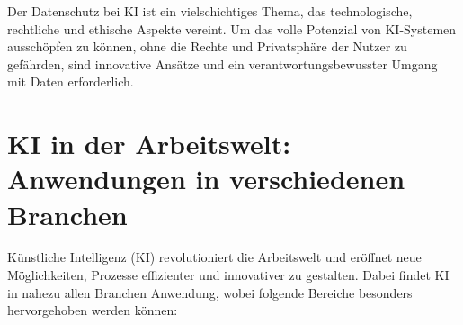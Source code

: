 \documentclass[a4paper,12pt]{article}
\begin{document}
Der Datenschutz bei KI ist ein vielschichtiges Thema, das technologische, rechtliche und ethische Aspekte vereint. Um das volle Potenzial von KI-Systemen ausschöpfen zu können, ohne die Rechte und Privatsphäre der Nutzer zu gefährden, sind innovative Ansätze und ein verantwortungsbewusster Umgang mit Daten erforderlich.



\section{KI in der Arbeitswelt: Anwendungen in verschiedenen Branchen}

Künstliche Intelligenz (KI) revolutioniert die Arbeitswelt und eröffnet neue Möglichkeiten, Prozesse effizienter und innovativer zu gestalten. Dabei findet KI in nahezu allen Branchen Anwendung, wobei folgende Bereiche besonders hervorgehoben werden können:
\end{document}
